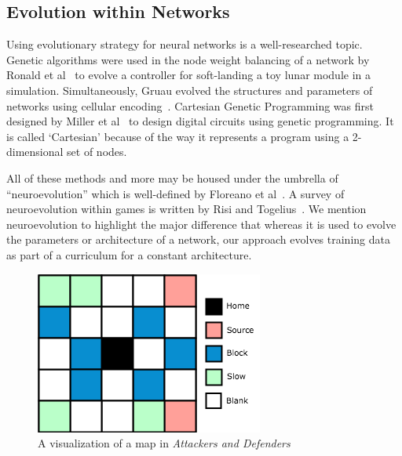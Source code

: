 \documentclass[letterpaper]{article} %
\begin{document}
\subsection{Evolution within Networks}
Using evolutionary strategy for neural networks is a well-researched topic. Genetic algorithms were used in the node weight balancing of a network by Ronald et al~\cite{ronald1994genetic} to evolve a controller for soft-landing a toy lunar module in a simulation. Simultaneously, Gruau evolved the structures and parameters of networks using cellular encoding~\cite{gruau1994neural}. Cartesian Genetic Programming was first designed by Miller et al~\cite{miller1997designing} to design digital circuits using genetic programming. It is called `Cartesian' because of the way it represents a program using a 2-dimensional set of nodes. 

All of these methods and more may be housed under the umbrella of ``neuroevolution'' which is well-defined by Floreano et al~\cite{floreano2008neuroevolution}. A survey of neuroevolution within games is written by Risi and Togelius~\cite{risi2017neuroevolution}. We mention neuroevolution to highlight the major difference that whereas it is used to evolve the parameters or architecture of a network, our approach evolves training data as part of a curriculum for a constant architecture.

\begin{figure}
\includegraphics[width=\linewidth]{graphics/map-rep-1.png}
\caption{A visualization of a map in \textit{Attackers and Defenders}}
\label{fig:map-rep}
\end{figure}
\end{document}
